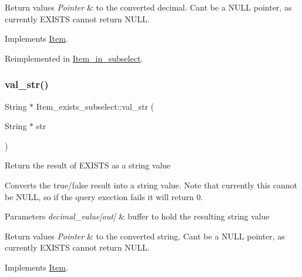 \begin{DoxyRetVals}{Return values}
{\em Pointer} & to the converted decimal. Can\textquotesingle{}t be a N\+U\+LL pointer, as currently E\+X\+I\+S\+TS cannot return N\+U\+LL. \\
\hline
\end{DoxyRetVals}


Implements \mbox{\hyperlink{classItem}{Item}}.



Reimplemented in \mbox{\hyperlink{classItem__in__subselect_a836c4419eaf559098971462e924ffb3d}{Item\+\_\+in\+\_\+subselect}}.

\mbox{\label{classItem__exists__subselect_a008b448e0e9dab80098ece5e2ce18881}} 
\subsubsection{\texorpdfstring{val\+\_\+str()}{val\_str()}}
{\footnotesize\ttfamily String $\ast$ Item\+\_\+exists\+\_\+subselect\+::val\+\_\+str (\begin{DoxyParamCaption}\item[{String $\ast$}]{str }\end{DoxyParamCaption})\hspace{0.3cm}{\ttfamily [virtual]}}

Return the result of E\+X\+I\+S\+TS as a string value

Converts the true/false result into a string value. Note that currently this cannot be N\+U\+LL, so if the query exection fails it will return 0.


\begin{DoxyParams}{Parameters}
{\em decimal\+\_\+value\mbox{[}out\mbox{]}} & buffer to hold the resulting string value \\
\hline
\end{DoxyParams}

\begin{DoxyRetVals}{Return values}
{\em Pointer} & to the converted string. Can\textquotesingle{}t be a N\+U\+LL pointer, as currently E\+X\+I\+S\+TS cannot return N\+U\+LL. \\
\hline
\end{DoxyRetVals}


Implements \mbox{\hyperlink{classItem}{Item}}.



